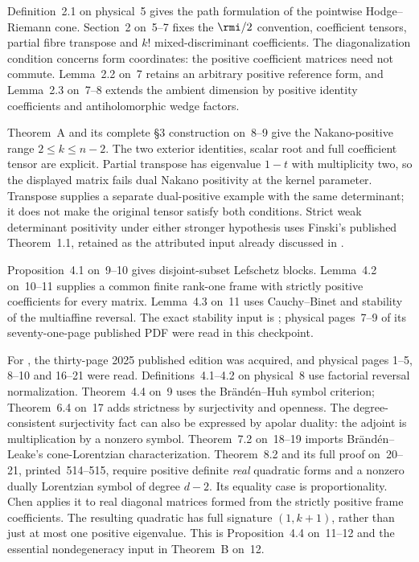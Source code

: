 Definition~2.1 on physical~5 gives the path formulation of
the pointwise Hodge--Riemann cone. Section~2 on~5--7 fixes
the $\rmi/2$ convention, coefficient tensors, partial fibre
transpose and $k!$ mixed-discriminant coefficients. The
diagonalization condition concerns form coordinates: the
positive coefficient matrices need not commute. Lemma~2.2
on~7 retains an arbitrary positive reference form, and
Lemma~2.3 on~7--8 extends the ambient dimension by positive
identity coefficients and antiholomorphic wedge factors.

Theorem~A and its complete \S3 construction on~8--9 give
the Nakano-positive range $2\leq k\leq n-2$. The two
exterior identities, scalar root and full coefficient tensor
are explicit. Partial transpose has eigenvalue $1-t$ with
multiplicity two, so the displayed matrix fails dual Nakano
positivity at the kernel parameter. Transpose supplies a
separate dual-positive example with the same determinant;
it does not make the original tensor satisfy both conditions.
Strict weak determinant positivity under either stronger
hypothesis uses Finski's published Theorem~1.1, retained as
the attributed input already discussed in
.

Proposition~4.1 on~9--10 gives disjoint-subset Lefschetz
blocks. Lemma~4.2 on~10--11 supplies a common finite rank-one
frame with strictly positive coefficients for every matrix.
Lemma~4.3 on~11 uses Cauchy--Binet and stability of the
multiaffine reversal. The exact stability input is
\cite[Proposition~2.2, physical p.~8, printed p.~828]{BrandenHuh20Lorentzian};
physical pages~7--9 of its seventy-one-page published PDF
were read in this checkpoint.

For \cite{RossSuessWannerer25DuallyPublished}, the thirty-page
2025 published edition was acquired, and physical pages
1--5, 8--10 and 16--21 were read. Definitions~4.1--4.2 on
physical~8 use factorial reversal normalization. Theorem~4.4
on~9 uses the Br\"and\'en--Huh symbol criterion; Theorem~6.4
on~17 adds strictness by surjectivity and openness. The
degree-consistent surjectivity fact can also be expressed
by apolar duality: the adjoint is multiplication by a nonzero
symbol. Theorem~7.2 on~18--19 imports Br\"and\'en--Leake's
cone-Lorentzian characterization. Theorem~8.2 and its full
proof on~20--21, printed~514--515, require positive definite
\emph{real} quadratic forms and a nonzero dually Lorentzian
symbol of degree $d-2$. Its equality case is proportionality.
Chen applies it to real diagonal matrices formed from the
strictly positive frame coefficients. The resulting quadratic
has full signature $(1,k+1)$, rather than just at most one
positive eigenvalue. This is Proposition~4.4 on~11--12 and
the essential nondegeneracy input in Theorem~B on~12.

